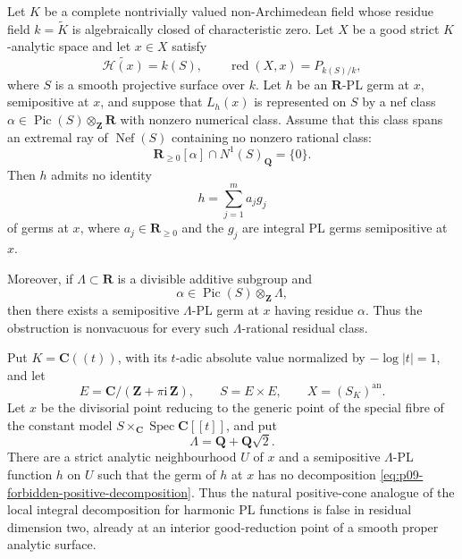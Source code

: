 \begin{proposition}
\label{prop:p09-irrational-nef-ray-obstruction}
Let \(K\) be a complete nontrivially valued non-Archimedean field whose
residue field \(k=\widetilde K\) is algebraically closed of characteristic
zero.  Let \(X\) be a good strict \(K\)-analytic space and let \(x\in X\)
satisfy
\[
 \widetilde{\mathscr H(x)}=k(S),
 \qquad
 \operatorname{red}(X,x)=P_{k(S)/k},
\]
where \(S\) is a smooth projective surface over \(k\).  Let \(h\) be an
\(\mathbf R\)-PL germ at \(x\), semipositive at \(x\), and suppose that
\(L_h(x)\) is represented on \(S\) by a nef class
\(\alpha\in\operatorname{Pic}(S)\otimes_{\mathbf Z}\mathbf R\) with
nonzero numerical class.  Assume that this class spans an extremal
ray of \(\operatorname{Nef}(S)\) containing no nonzero rational class:
\begin{equation}
\label{eq:p09-irrational-extremal-ray}
 \mathbf R_{\geq0}[\alpha]\cap N^1(S)_{\mathbf Q}=\{0\}.
\end{equation}
Then \(h\) admits no identity
\begin{equation}
\label{eq:p09-forbidden-positive-decomposition}
                         h=\sum_{j=1}^{m}a_jg_j
\end{equation}
of germs at \(x\), where \(a_j\in\mathbf R_{\geq0}\) and the \(g_j\) are
integral PL germs semipositive at \(x\).

Moreover, if \(\Lambda\subset\mathbf R\) is a divisible additive subgroup
and
\[
                 \alpha\in
                 \operatorname{Pic}(S)\otimes_{\mathbf Z}\Lambda,
\]
then there exists a semipositive \(\Lambda\)-PL germ at \(x\) having
residue \(\alpha\).  Thus the obstruction is nonvacuous for every such
\(\Lambda\)-rational residual class.
\end{proposition}

\begin{corollary}
\label{cor:p09-good-reduction-positive-cone-counterexample}
Put \(K=\mathbf C((t))\), with its \(t\)-adic absolute value normalized by
\(-\log|t|=1\), and let
\[
 E=\mathbf C/(\mathbf Z+\pi\mathrm i\,\mathbf Z),
 \qquad S=E\times E,
 \qquad X=(S_K)^{\mathrm{an}}.
\]
Let \(x\) be the divisorial point reducing to the generic point of the
special fibre of the constant model
\(S\times_{\mathbf C}\operatorname{Spec}\mathbf C[[t]]\), and put
\[
                         \Lambda=\mathbf Q+\mathbf Q\sqrt2.
\]
There are a strict analytic neighbourhood \(U\) of \(x\) and a
semipositive \(\Lambda\)-PL function \(h\) on \(U\) such that the germ of
\(h\) at \(x\) has no decomposition
\eqref{eq:p09-forbidden-positive-decomposition}.  Thus the natural
positive-cone analogue of the local integral decomposition for harmonic PL
functions is false in residual dimension two, already at an interior
good-reduction point of a smooth proper analytic surface.
\end{corollary}
